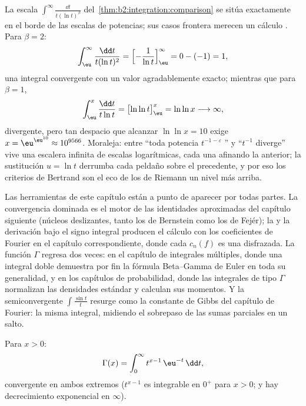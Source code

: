 \begin{example}\label{ex:b2:integration:bertrandboundary}
La escala $\int^\infty\frac{\dd t}{t(\ln t)^\beta}$ del~\cref{thm:b2:integration:comparison} se sitúa exactamente en el
borde de las escalas de potencias; sus casos frontera merecen un
cálculo . Para $\beta = 2$:
\[
\int_\eu^{\infty}\frac{\dd t}{t(\ln t)^2}
= \Bigl[-\frac{1}{\ln t}\Bigr]_\eu^{\infty}
= 0 - (-1) = 1 ,
\]
una integral convergente con un valor agradablemente exacto;
mientras que para $\beta = 1$,
\[
\int_\eu^{x}\frac{\dd t}{t\ln t}
= \bigl[\ln\ln t\bigr]_\eu^{x} = \ln\ln x
\longrightarrow \infty ,
\]
divergente, pero tan despacio que alcanzar $\ln\ln x = 10$ exige $x
= \eu^{\eu^{10}} \approx 10^{9566}$. Moraleja: entre ``toda potencia
$t^{-1-\varepsilon}$ '' y ``$t^{-1}$ diverge'' vive una
escalera infinita de escalas logarítmicas, cada una afinando la
anterior; la sustitución $u = \ln t$ derrumba cada peldaño sobre el
precedente, y por eso los criterios de Bertrand son el eco de los de
Riemann un nivel más arriba.
\end{example}

\begin{remark}
Las herramientas de este capítulo están a punto de aparecer por
todas partes. La convergencia dominada es el motor de las
identidades aproximadas del capítulo siguiente (núcleos
deslizantes, tanto los de Bernstein como los de Fejér); la
 y la derivación bajo el signo integral producen el
cálculo con los coeficientes de Fourier en el capítulo
correspondiente, donde cada $c_n(f)$ es una 
disfrazada. La función $\Gamma$ regresa dos veces: en el capítulo de
integrales múltiples, donde una integral doble demuestra por fin la
fórmula Beta--Gamma de Euler en toda su generalidad, y en los
capítulos de probabilidad, donde las integrales de tipo $\Gamma$
normalizan las densidades estándar y calculan sus momentos. Y la
semiconvergente $\int\frac{\sin t}{t}$ resurge como la constante de
Gibbs del capítulo de Fourier: la misma integral, midiendo el
sobrepaso de las sumas parciales en un salto.
\end{remark}

\begin{definition}\label{def:b2:integration:gamma}
Para $x > 0$:
\[
\Gamma(x) = \int_0^{\infty} t^{x-1}\,\eu^{-t}\,\dd t ,
\]
convergente en ambos extremos ($t^{x-1}$ es integrable en $0^+$ para
$x > 0$; y hay decrecimiento exponencial en $\infty$).
\end{definition}

